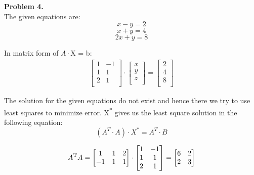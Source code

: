 \documentclass[a4paper]{article}
\begin{document}
\hfill \newline
\textbf{Problem 4.}\\
The given equations are:
\begin{equation}
 x - y = 2
\end{equation}
\begin{equation}
 x + y = 4
\end{equation}
\begin{equation}
 2x + y = 8
\end{equation}

In matrix form of $A \cdot $X = b:
\begin{align}  
\begin{bmatrix}
   1 & -1\\
   1 & 1 \\
   2 & 1\\
 \end{bmatrix}
\cdot
\begin{bmatrix}
  x\\
  y\\ 
  z\\
 \end{bmatrix}
=
\begin{bmatrix}
2\\
 4\\
8\\
\end{bmatrix}
\end{align}

The solution for the given equations do not exist and hence there we try to use least squares to minimize error. X\textsuperscript{*} gives us the least square solution in the following equation:
\begin{equation}
(A^{T} \cdot A) \cdot X^{*} = A^{T} \cdot B
\end{equation}

\begin{align} 
A\textsuperscript{T}A =
\begin{bmatrix}
   1 & 1 & 2\\
   -1 & 1 & 1 \\
 \end{bmatrix}
 \cdot
 \begin{bmatrix}
   1 & -1\\
   1 & 1 \\
   2 & 1\\
 \end{bmatrix} 
 =
\begin{bmatrix}
   6 & 2\\
   2 & 3 \\
 \end{bmatrix}
\end{align}
\end{document}
